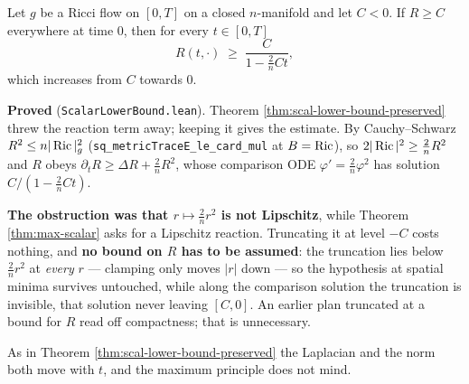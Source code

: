 \begin{theorem}
  \label{thm:hamilton-scal-lower}
  \leanok
  Let $g$ be a Ricci flow on $[0,T]$ on a closed $n$-manifold and let $C < 0$. If
  $R \ge C$ everywhere at time $0$, then for every $t \in [0,T]$
  \[
    R(t,\cdot) \;\ge\; \frac{C}{1 - \tfrac{2}{n} C t},
  \]
  which increases from $C$ towards $0$.

  \textbf{Proved} (\texttt{ScalarLowerBound.lean}). Theorem
  \ref{thm:scal-lower-bound-preserved} threw the reaction term away; keeping it gives
  the estimate. By Cauchy--Schwarz $R^2 \le n|\operatorname{Ric}|^2_g$
  (\texttt{sq\_metricTraceE\_le\_card\_mul} at $B = \operatorname{Ric}$), so
  $2|\operatorname{Ric}|^2 \ge \tfrac{2}{n}R^2$ and $R$ obeys
  $\partial_t R \ge \Delta R + \tfrac{2}{n}R^2$, whose comparison ODE
  $\varphi' = \tfrac{2}{n}\varphi^2$ has solution $C/(1 - \tfrac{2}{n}Ct)$.

  \textbf{The obstruction was that $r \mapsto \tfrac{2}{n}r^2$ is not Lipschitz},
  while Theorem \ref{thm:max-scalar} asks for a Lipschitz reaction. Truncating it at
  level $-C$ costs nothing, and \textbf{no bound on $R$ has to be assumed}: the
  truncation lies below $\tfrac{2}{n}r^2$ at \emph{every} $r$ --- clamping only moves
  $|r|$ down --- so the hypothesis at spatial minima survives untouched, while along
  the comparison solution the truncation is invisible, that solution never leaving
  $[C,0]$. An earlier plan truncated at a bound for $R$ read off compactness; that is
  unnecessary.

  As in Theorem \ref{thm:scal-lower-bound-preserved} the Laplacian and the norm both
  move with $t$, and the maximum principle does not mind.
\end{theorem}

